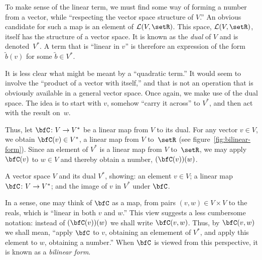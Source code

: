 \documentclass[10pt, a4paper]{article}
\begin{document}
To make sense of the linear term, we must find some way of forming a
number from a vector, while “respecting the vector space structure of
$V$.” An obvious candidate for such a map is an element of $\mathcal{L}(V,
\setR)$. This space, $\mathcal{L}(V, \setR)$, itself has the structure of a
vector space. It is known as the \emph{dual} of $V$ and is
denoted~$V^*$. A term that is “linear in $v$” is therefore an
expression of the form $\tilde{b}(v)$ for some $\tilde{b}\in V^*$.

It is less clear what might be meant by a “quadratic term.” It would
seem to involve the “product of a vector with itself,” and that is not
an operation that is obviously available in a general vector
space. Once again, we make use of the dual space. The idea is to start
with $v$, somehow “carry it across” to $V^*$, and then act with the
result on~$w$.

Thus, let $\bfC\colon V\to V^*$ be a linear map from $V$ to its dual. For
any vector $v\in V$, we obtain $\bfC(v)\in V^*$, a linear map from $V$
to~$\setR$ (see figure~\ref{fig:bilinear-form}). Since an element of $V^*$ is a linear map from $V$
to~$\setR$, we may apply $\bfC(v)$ to $w\in V$ and thereby obtain a number,
$(\bfC(v))(w)$. 

\begin{marginfigure}
  \begin{center}
  \end{center}
  \caption{A vector space $V$ and its dual $V^*$, showing: an element
    $v\in V$; a linear map $\bfC\colon V\to V^*$; and the image of $v$ in
    $V^*$ under $\bfC$.\label{fig:bilinear-form}}
\end{marginfigure}
In a sense, one may think of $\bfC$ as a map, from pairs
$(v,w)\in V\times V$ to the reals, which is “linear in both $v$ and
$w$.” This view suggests a less cumbersome notation: instead of
$(\bfC(v))(w)$ we shall write $\bfC(v,w)$. Thus, by $\bfC(v, w)$ we shall mean,
“apply $\bfC$ to $v$, obtaining an elemement of $V^*$, and apply this
element to $w$, obtaining a number.” When $\bfC$ is viewed from this
perspective, it is known as a \emph{bilinear form}.
\end{document}
